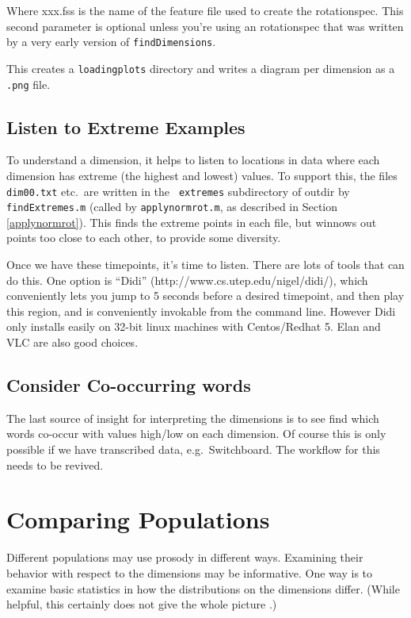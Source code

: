 \documentclass[11pt]{article}
\begin{document}
Where xxx.fss is the name of the feature file used to create the
rotationspec.  This second parameter is optional unless you're using
an rotationspec that was written by a very early version of
{\tt findDimensions}.

This creates a {\tt loadingplots} directory and writes a diagram
per dimension as a {\tt .png} file.

\subsection{Listen to Extreme Examples}

To understand a dimension, it helps to listen to locations in data
where each dimension has extreme (the highest and lowest) values.  To
support this, the files {\tt dim00.txt} etc.\ are written in the {\tt
  extremes} subdirectory of outdir by {\tt findExtremes.m} (called by
{\tt applynormrot.m}, as described in Section \ref{applynormrot}).
This finds the extreme points in each file, but winnows out points too
close to each other, to provide some diversity.

Once we have these timepoints, it's time to listen.  There are lots of
tools that can do this.  One option is ``Didi''
(http://www.cs.utep.edu/nigel/didi/), which conveniently lets you jump
to 5 seconds before a desired timepoint, and then play this region,
and is conveniently invokable from the command line.  However Didi
only installs easily on 32-bit linux machines with Centos/Redhat 5.
Elan and VLC are also good choices.


\subsection{Consider Co-occurring words} 

The last source of insight for interpreting the dimensions is to see
find which words co-occur with values high/low on each dimension.  Of
course this is only possible if we have transcribed data,
e.g.~Switchboard.  The workflow for this needs to be revived.


\section{Comparing Populations}

Different populations may use prosody in different ways.  Examining
their behavior with respect to the dimensions may be informative.  One
way is to examine basic statistics in how the distributions on the
dimensions differ.  (While helpful, this certainly does not give the
whole picture \cite{l2english}.)
\end{document}
